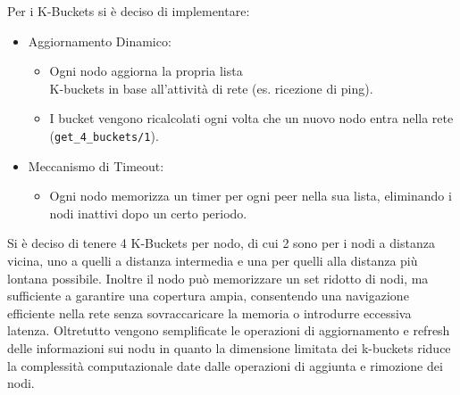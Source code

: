 \documentclass{article}
\begin{document}
Per i K-Buckets si è deciso di implementare:
\begin{itemize}
    \item Aggiornamento Dinamico:
    \begin{itemize}
        \item Ogni nodo aggiorna la propria lista\\ K-buckets in base all'attività di rete (es. ricezione di ping).
        \item I bucket vengono ricalcolati ogni volta che un nuovo nodo entra nella rete \\ (\texttt{get\_4\_buckets/1}).
    \end{itemize}
    \item Meccanismo di Timeout:
    \begin{itemize}
        \item Ogni nodo memorizza un timer per ogni peer nella sua lista, eliminando i nodi inattivi dopo un certo periodo.
    \end{itemize}
\end{itemize}
Si è deciso di tenere 4 K-Buckets per nodo, di cui 2 sono per i nodi a distanza vicina, uno a quelli a distanza intermedia e una per quelli alla distanza più lontana possibile. Inoltre il nodo può memorizzare un set ridotto di nodi, ma sufficiente a garantire una copertura ampia, consentendo una navigazione efficiente nella rete senza sovraccaricare la memoria o introdurre eccessiva latenza. Oltretutto vengono semplificate le operazioni di aggiornamento e refresh delle informazioni sui nodu in quanto la dimensione limitata dei k-buckets riduce la complessità computazionale date dalle operazioni di aggiunta e rimozione dei nodi.
\end{document}
